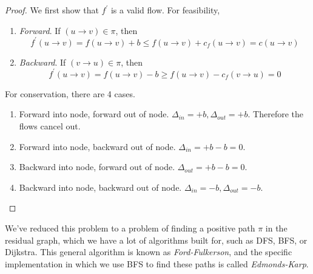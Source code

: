   \begin{proof}
    We first show that $f^\prime$ is a valid flow. For feasibility, 
    \begin{enumerate}
      \item \textit{Forward}. If $(u \rightarrow  v) \in \pi$, then 
        \begin{equation}
          f^\prime (u \rightarrow v) = f(u \rightarrow v) + b \leq f(u \rightarrow v) + c_f (u \rightarrow v) = c(u \rightarrow v)
        \end{equation} 
      \item \textit{Backward}. If $(v \rightarrow u) \in \pi$, then 
        \begin{equation}
        f^\prime (u \rightarrow v) = f(u \rightarrow v) - b \geq f(u \rightarrow v) - c_f (v \rightarrow u) = 0 
        \end{equation}
    \end{enumerate}

    For conservation, there are 4 cases. 
    \begin{enumerate}
      \item Forward into node, forward out of node. $\Delta_{in} = +b, \Delta_{out} = +b$. Therefore the flows cancel out. 
      \item Forward into node, backward out of node. $\Delta_{in} = +b - b = 0$. 
      \item Backward into node, forward out of node. $\Delta_{out} = +b - b = 0$. 
      \item Backward into node, backward out of node. $\Delta_{in} = -b, \Delta_{out} = - b$. 
    \end{enumerate}
  \end{proof} 

  We've reduced this problem to a problem of finding a positive path $\pi$ in the residual graph, which we have a lot of algorithms built for, such as DFS, BFS, or Dijkstra. This general algorithm is known as \textit{Ford-Fulkerson}, and the specific implementation in which we use BFS to find these paths is called \textit{Edmonds-Karp}. 

